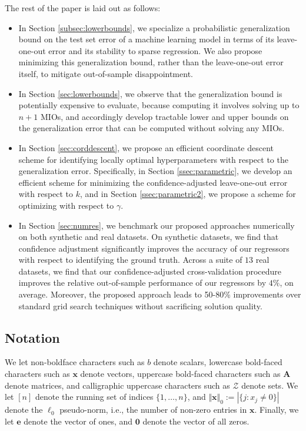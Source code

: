 \documentclass[opre,nonblindrev]{informs3} %
\begin{document}
The rest of the paper is laid out as follows:
\begin{itemize}
\item In Section \ref{subsec:lowerbounds}, we specialize a probabilistic generalization bound on the test set error of a machine learning model in terms of its leave-one-out error and its stability to sparse regression. We also propose minimizing this generalization bound, rather than the leave-one-out error itself, to mitigate out-of-sample disappointment.
\item In Section \ref{sec:lowerbounds}, we observe that the generalization bound is potentially expensive to evaluate, because computing it involves solving up to $n+1$ MIOs, and accordingly develop tractable lower and upper bounds on the generalization error that can be computed without solving any MIOs.

\item In Section \ref{sec:corddescent}, we propose an efficient coordinate descent scheme for identifying locally optimal hyperparameters with respect to the generalization error. Specifically, in Section \ref{ssec:parametric}, we develop an efficient scheme for minimizing the confidence-adjusted leave-one-out error with respect to $k$, and in Section \ref{ssec:parametric2}, we propose a scheme for optimizing with respect to $\gamma$.
\item In Section \ref{sec:numres}, we benchmark our proposed approaches numerically on both synthetic and real datasets. On synthetic datasets, we find that confidence adjustment significantly improves the accuracy of our regressors with respect to identifying the ground truth. Across a suite of $13$ real datasets, we find that our confidence-adjusted cross-validation procedure improves the relative out-of-sample performance of our regressors by $4\%$, on average. Moreover, the proposed approach leads to 50-80\% improvements over standard grid search techniques without sacrificing solution quality.
\end{itemize}

\subsection*{Notation} We let non-boldface characters such as $b$ denote scalars, lowercase bold-faced characters such as $\bm{x}$ denote vectors, uppercase bold-faced characters such as $\bm{A}$ denote matrices, and calligraphic uppercase characters such as $\mathcal{Z}$ denote sets. We let $[n]$ denote the running set of indices $\{1, \dots, n\}$, and $\Vert \bm{x}\Vert_0:=|\{j: x_j \neq 0\}|$ denote the $\ell_0$ pseudo-norm, i.e., the number of non-zero entries in $\bm{x}$. Finally, we let $\bm{e}$ denote the vector of ones, and $\bm{0}$ denote the vector of all zeros. 
\end{document}
